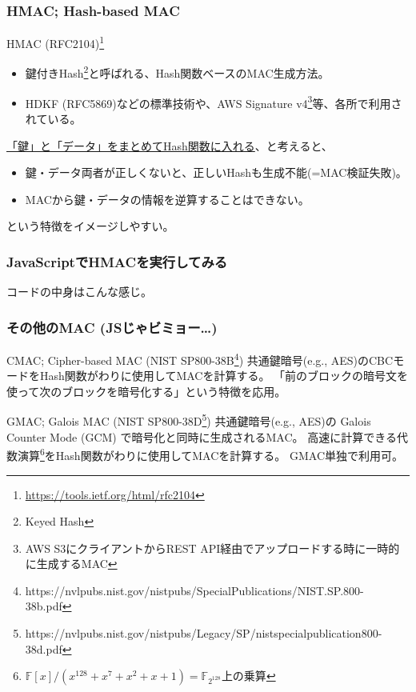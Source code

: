 \documentclass[12pt,dvipdfmx]{beamer}
\begin{document}
\begin{frame}
\frametitle{HMAC; Hash-based MAC}
\begin{block}{\small HMAC (RFC2104)\footnote[frame]{\scriptsize \url{https://tools.ietf.org/html/rfc2104}}}
\begin{itemize}
 \item 鍵付きHash\footnote[frame]{\scriptsize Keyed Hash}と呼ばれる、Hash関数ベースのMAC生成方法。
 \item HDKF (RFC5869)などの標準技術や、AWS Signature v4\footnote[frame]{\scriptsize AWS S3にクライアントからREST API経由でアップロードする時に一時的に生成するMAC}等、各所で利用されている。
\end{itemize}
\end{block}
\underline{「鍵」と「データ」をまとめてHash関数に入れる}、と考えると、
\begin{itemize}
 \item 鍵・データ両者が正しくないと、正しいHashも生成不能(=MAC検証失敗)。
 \item MACから鍵・データの情報を逆算することはできない。
\end{itemize}
という特徴をイメージしやすい。
\end{frame}

\begin{frame}
\frametitle{JavaScriptでHMACを実行してみる}
\end{frame}

\begin{frame}
コードの中身はこんな感じ。
\end{frame}

\begin{frame}
\frametitle{その他のMAC (JSじゃビミョー…)}
\begin{block}{\small CMAC; Cipher-based MAC (NIST SP800-38B\footnote[frame]{\scriptsize https://nvlpubs.nist.gov/nistpubs/SpecialPublications/NIST.SP.800-38b.pdf})}
\alert{共通鍵暗号(e.g., AES)のCBCモードをHash関数がわりに使用}してMACを計算する。
「前のブロックの暗号文を使って次のブロックを暗号化する」という特徴を応用。
\end{block}

\begin{block}{\small GMAC; Galois MAC (NIST SP800-38D\footnote[frame]{\scriptsize https://nvlpubs.nist.gov/nistpubs/Legacy/SP/nistspecialpublication800-38d.pdf})}
共通鍵暗号(e.g., AES)の Galois Counter Mode (GCM) で暗号化と同時に生成されるMAC。
\alert{高速に計算できる代数演算\footnote[frame]{\scriptsize $\mathbb{F}[x]/(x^{128}\!+\!x^7\!+\!x^2\!+\!x\!+\!1) = \mathbb{F}_{2^{128}}$上の乗算}をHash関数がわりに使用}してMACを計算する。
GMAC単独で利用可。
\end{block}

\end{frame}
\end{document}
